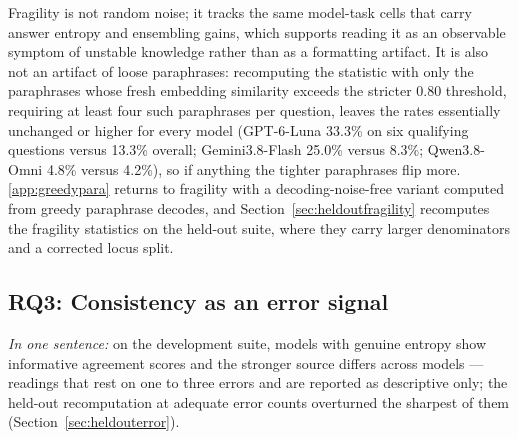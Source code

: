 Fragility is not random noise; it tracks the same model-task cells that carry answer entropy and ensembling gains, which supports reading it as an observable symptom of unstable knowledge rather than as a formatting artifact. It is also not an artifact of loose paraphrases: recomputing the statistic with only the paraphrases whose fresh embedding similarity exceeds the stricter 0.80 threshold, requiring at least four such paraphrases per question, leaves the rates essentially unchanged or higher for every model (GPT-6-Luna 33.3\% on six qualifying questions versus 13.3\% overall; Gemini3.8-Flash 25.0\% versus 8.3\%; Qwen3.8-Omni 4.8\% versus 4.2\%), so if anything the tighter paraphrases flip more. \ref{app:greedypara} returns to fragility with a decoding-noise-free variant computed from greedy paraphrase decodes, and Section~\ref{sec:heldoutfragility} recomputes the fragility statistics on the held-out suite, where they carry larger denominators and a corrected locus split.

\subsection{RQ3: Consistency as an error signal}
\label{app:rq3}
\label{sec:rq3}

\emph{In one sentence:} on the development suite, models with genuine entropy show informative agreement scores and the stronger source differs across models --- readings that rest on one to three errors and are reported as descriptive only; the held-out recomputation at adequate error counts overturned the sharpest of them (Section~\ref{sec:heldouterror}).

